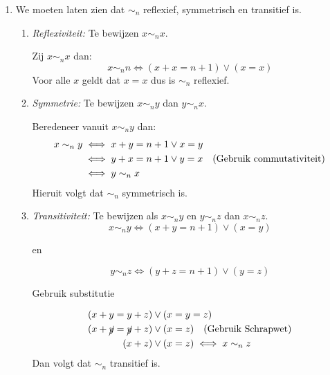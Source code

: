 \documentclass{article}
\begin{document}
\begin{enumerate}[label=\alph*)]
    \item
          We moeten laten zien dat $\sim_n$ reflexief, symmetrisch en transitief is.
          \begin{enumerate}[label=\arabic*.]
              \item \emph{Reflexiviteit:} Te bewijzen $x \sim_n x$.

                    Zij $x \sim_n x$ dan:
                    \[x \sim_n n \iff (x + x = n + 1) \vee (x = x)\]
                    Voor alle $x$ geldt dat $x = x$ dus is $\sim_n$ reflexief.
              \item \emph{Symmetrie:} Te bewijzen $x \sim_n y$ dan $y \sim_n x$.

                    Beredeneer vanuit $x \sim_n y$ dan:
                    \begin{align*}
                        x  \sim_n y & \iff x + y = n + 1 \vee x = y                                      \\
                                    & \iff y + x = n + 1 \vee y = x \quad (\text{Gebruik commutativiteit}) \\
                                    & \iff y \sim_n x
                    \end{align*}
                    Hieruit volgt dat $\sim_n$ symmetrisch is.
              \item \emph{Transitiviteit:}
                    Te bewijzen als $x \sim_n y$ en $y \sim_n z$ dan $x \sim_n z$.
                    \[x \sim_n y \iff (x + y = n + 1) \vee (x = y)\]
                    \begin{center}
                        en
                    \end{center}
                    \[y \sim_n z \iff (y + z = n + 1) \vee (y = z)\]
                    \begin{center}
                        Gebruik substitutie
                    \end{center}
                    \begin{align*}
                        (x + y = y + z)           & \vee (x = y = z)                            \\
                        (x + \cancel{y} = \cancel{y} + z) & \vee (x = z) \quad (\text{Gebruik Schrapwet}) \\
                        (x + z)                   & \vee (x = z) \iff x \sim_n z
                    \end{align*}
                    Dan volgt dat $\sim_n$ transitief is.

\end{enumerate}
\end{enumerate}
\end{document}
